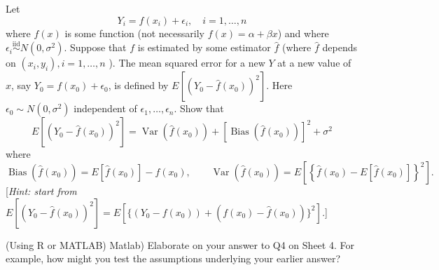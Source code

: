 \documentclass[answers]{exam}
\begin{document}
\begin{questions}
\question%
Let \[
	Y_{i}=f\left(x_{i}\right)+\epsilon_{i}, \quad i=1, \ldots, n
\] where $f(x)$ is some function (not necessarily $f(x)=\alpha+\beta x$) and where $\epsilon_{i} \stackrel{\text {iid}}{\sim} N\left(0, \sigma^{2}\right)$. Suppose that $f$ is estimated by some estimator $\widehat{f}$ (where $\widehat{f}$ depends on $\left(x_{i}, y_{i}\right), i=1, \ldots, n$ ). The mean squared error for a new $Y$ at a new value of $x$, say $Y_{0}=f\left(x_{0}\right)+\epsilon_{0}$, is defined by $E\left[\left(Y_{0}-\widehat{f}\left(x_{0}\right)\right)^{2}\right]$. Here $\epsilon_{0} \sim N\left(0, \sigma^{2}\right)$ independent of $\epsilon_{1}, \ldots, \epsilon_{n}$. Show that \[
	E\left[\left(Y_{0}-\widehat{f}\left(x_{0}\right)\right)^{2}\right]=\operatorname{Var}\left(\widehat{f}\left(x_{0}\right)\right)+\left[\operatorname{Bias}\left(\widehat{f}\left(x_{0}\right)\right)\right]^{2}+\sigma^{2}
\] where \[
	\operatorname{Bias}\left(\widehat{f}\left(x_{0}\right)\right) =E\left[\widehat{f}\left(x_{0}\right)\right]-f\left(x_{0}\right), \qquad
	\operatorname{Var}\left(\widehat{f}\left(x_{0}\right)\right) =E\left[\left\{\widehat{f}\left(x_{0}\right)-E\left[\widehat{f}\left(x_{0}\right)\right]\right\}^{2}\right] .
\] [\emph{Hint: start from $E[(Y_{0}-\widehat{f}(x_{0}))^{2}]=E[\{(Y_{0}-f(x_{0}))+(f(x_{0})-\widehat{f}(x_{0}))\}^{2}]$.}]



\question%
(Using R or MATLAB) Matlab) Elaborate on your answer to Q4 on Sheet 4. For example, how might you test the assumptions underlying your earlier answer?

\end{questions}
\end{document}
